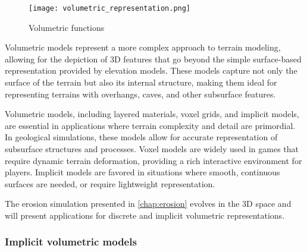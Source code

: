 \begin{figure}[H]
    \centering
    \texttt{[image: volumetric\_representation.png]}
    \caption{Volumetric functions}
    \label{fig:erosion-volume-representation}
\end{figure}

Volumetric models represent a more complex approach to terrain modeling, allowing for the depiction of 3D features that go beyond the simple surface-based representation provided by elevation models. These models capture not only the surface of the terrain but also its internal structure, making them ideal for representing terrains with overhangs, caves, and other subsurface features. 

Volumetric models, including layered materials, voxel grids, and implicit models, are essential in applications where terrain complexity and detail are primordial. In geological simulations, these models allow for accurate representation of subsurface structures and processes. Voxel models are widely used in games that require dynamic terrain deformation, providing a rich interactive environment for players. Implicit models are favored in situations where smooth, continuous surfaces are needed, or require lightweight representation.

The erosion simulation presented in \cref{chap:erosion} evolves in the 3D space and will present applications for discrete and implicit volumetric representations.

\subsubsection{Implicit volumetric models}

